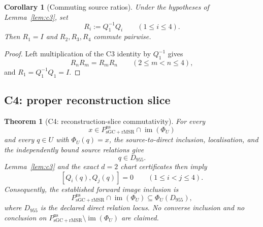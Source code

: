 \documentclass[11pt]{article}
\newtheorem{theorem}{Theorem}
\newtheorem{corollary}{Corollary}
\theoremstyle{definition}
\theoremstyle{remark}
\newcommand{\im}{\operatorname{im}}
\begin{document}
\begin{corollary}[Commuting source ratios]
\label{cor:c3-ratios}
Under the hypotheses of Lemma~\ref{lem:c3}, set
\[
  R_i:=Q_1^{-1}Q_i\qquad(1\leq i\leq4).
\]
Then \(R_1=I\) and \(R_2,R_3,R_4\) commute pairwise.
\end{corollary}

\begin{proof}
Left multiplication of the C3 identity by \(Q_1^{-1}\) gives
\[
  R_nR_m=R_mR_n\qquad(2\leq m<n\leq4),
\]
and \(R_1=Q_1^{-1}Q_1=I\).
\end{proof}

\subsection{C4: proper reconstruction slice}

\begin{theorem}[C4: reconstruction-slice commutativity]
\label{thm:c4}
For every
\[
  x\in P_{\mathrm{sGC+rMSR}}^{\mathrm{ns}}\cap\im(\Phi_U)
\]
and every \(q\in U\) with \(\Phi_U(q)=x\), the source-to-direct inclusion,
localisation, and the independently bound source relations give
\[
  q\in D_{955}.
\]
Lemma~\ref{lem:c3} and the exact \(d=2\) chart certificates then imply
\[
  [Q_i(q),Q_j(q)]=0\qquad(1\leq i<j\leq4).
\]
Consequently, the established forward image inclusion is
\[
  P_{\mathrm{sGC+rMSR}}^{\mathrm{ns}}\cap\im(\Phi_U)
  \subseteq\Phi_U(D_{955}),
\]
where \(D_{955}\) is the declared direct relation locus.  No converse
inclusion and no conclusion on
\(P_{\mathrm{sGC+rMSR}}^{\mathrm{ns}}\setminus\im(\Phi_U)\) are claimed.
\end{theorem}
\end{document}
